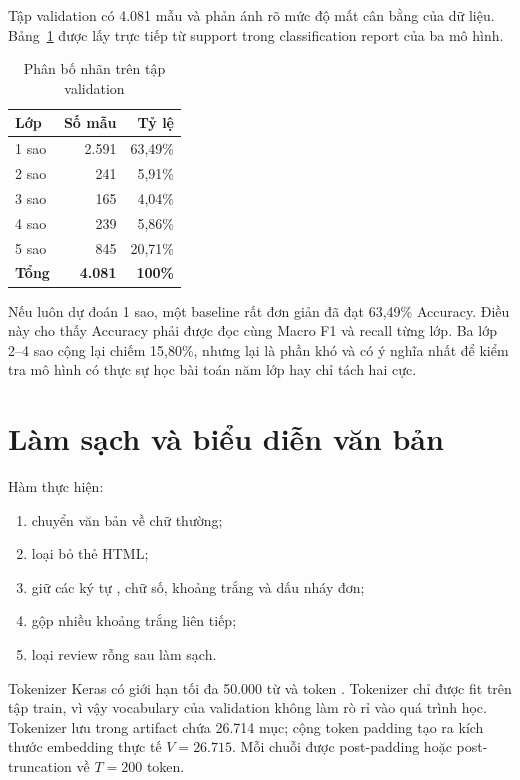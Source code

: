 \documentclass[12pt]{report}
\newcommand{\codeword}[1]{\texttt{\detokenize{#1}}}
\begin{document}
Tập validation có 4.081 mẫu và phản ánh rõ mức độ mất cân bằng của dữ liệu.
Bảng~\ref{tab:class-distribution} được lấy trực tiếp từ support trong
classification report của ba mô hình.

\begin{table}[H]
\centering
\caption{Phân bố nhãn trên tập validation}
\label{tab:class-distribution}
\begin{tabular}{lrr}
\toprule
\textbf{Lớp} & \textbf{Số mẫu} & \textbf{Tỷ lệ} \\
\midrule
1 sao & 2.591 & 63,49\% \\
2 sao & 241 & 5,91\% \\
3 sao & 165 & 4,04\% \\
4 sao & 239 & 5,86\% \\
5 sao & 845 & 20,71\% \\
\midrule
\textbf{Tổng} & \textbf{4.081} & \textbf{100\%} \\
\bottomrule
\end{tabular}
\end{table}

Nếu luôn dự đoán 1 sao, một baseline rất đơn giản đã đạt 63,49\% Accuracy.
Điều này cho thấy Accuracy phải được đọc cùng Macro F1 và recall từng lớp. Ba
lớp 2--4 sao cộng lại chiếm 15,80\%, nhưng lại là phần khó và có ý nghĩa nhất
để kiểm tra mô hình có thực sự học bài toán năm lớp hay chỉ tách hai cực.

\section{Làm sạch và biểu diễn văn bản}

Hàm \codeword{clean_text} thực hiện:

\begin{enumerate}
    \item chuyển văn bản về chữ thường;
    \item loại bỏ thẻ HTML;
    \item giữ các ký tự \codeword{a-z}, chữ số, khoảng trắng và dấu nháy đơn;
    \item gộp nhiều khoảng trắng liên tiếp;
    \item loại review rỗng sau làm sạch.
\end{enumerate}

Tokenizer Keras có giới hạn tối đa 50.000 từ và token
\codeword{<OOV>}. Tokenizer chỉ được fit trên tập train, vì vậy vocabulary của
validation không làm rò rỉ vào quá trình học. Tokenizer lưu trong artifact chứa
26.714 mục; cộng token padding tạo ra kích thước embedding thực tế
$V=26.715$. Mỗi chuỗi được post-padding hoặc post-truncation về
$T=200$ token.
\end{document}
